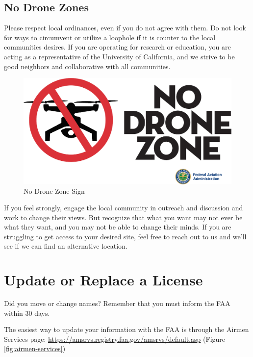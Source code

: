 \documentclass[
]{book}
\begin{document}
\hypertarget{no-drone-zones}{%
\section{No Drone Zones}\label{no-drone-zones}}

Please respect local ordinances, even if you do not agree with them. Do not look for ways to circumvent or utilize a loophole if it is counter to the local communities desires. If you are operating for research or education, you are acting as a representative of the University of California, and we strive to be good neighbors and collaborative with all communities.

\begin{figure}

{\centering \includegraphics[width=0.8\linewidth]{images/no-drone-zone} 

}

\caption{No Drone Zone Sign}\label{fig:no-drone-zone}
\end{figure}

If you feel strongly, engage the local community in outreach and discussion and work to change their views. But recognize that what you want may not ever be what they want, and you may not be able to change their minds. If you are struggling to get access to your desired site, feel free to reach out to us and we'll see if we can find an alternative location.

\hypertarget{ch-replace-license}{%
\chapter{Update or Replace a License}\label{ch-replace-license}}

Did you move or change names? Remember that you must inform the FAA within 30 days.

The easiest way to update your information with the FAA is through the Airmen Services page: \url{https://amsrvs.registry.faa.gov/amsrvs/default.asp} (Figure \ref{fig:airmen-services})
\end{document}
